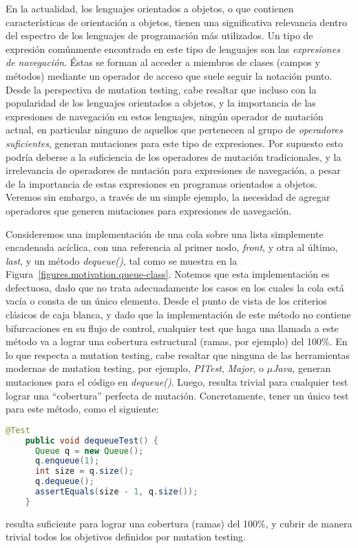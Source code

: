 En la actualidad, los lenguajes orientados a objetos, o que contienen caracter\'isticas de orientaci\'on a objetos, tienen una significativa relevancia dentro del espectro de los lenguajes de programaci\'on m\'as utilizados. Un tipo de expresi\'on com\'unmente encontrado en este tipo de lenguajes son las \emph{expresiones de navegaci\'on}. \'Estas se forman al acceder a miembros de clases (campos y m\'etodos) mediante un operador de acceso que suele seguir la notaci\'on punto. Desde la perspectiva de mutation testing, cabe resaltar que incluso con la popularidad de los lenguajes orientados a objetos, y la importancia de las expresiones de navegaci\'on en estos lenguajes, ning\'un operador de mutaci\'on actual, en particular ninguno de aquellos que pertenecen al grupo de \emph{operadores suficientes}, generan mutaciones para este tipo de expresiones. Por supuesto esto podr\'ia deberse a la suficiencia de los operadores de mutaci\'on tradicionales, y la irrelevancia de operadores de mutaci\'on para expresiones de navegaci\'on, a pesar de la importancia de estas expresiones en programas orientados a objetos. Veremos sin embargo, a trav\'es de un simple ejemplo, la necesidad de agregar operadores que generen mutaciones para expresiones de navegaci\'on.

Consideremos una implementaci\'on de una cola sobre una lista simplemente encadenada ac\'iclica, con una referencia al primer nodo, \emph{front}, y otra al \'ultimo, \emph{last}, y un m\'etodo \emph{dequeue()}, tal como se muestra en la Figura~\ref{figures.motivation.queue-class}. Notemos que esta implementaci\'on es defectuosa, dado que no trata adecuadamente los casos en los cuales la cola est\'a vac\'ia o consta de un \'unico elemento. Desde el punto de vista de los criterios cl\'asicos de caja blanca, y dado que la implementaci\'on de este m\'etodo no contiene bifurcaciones en su flujo de control, cualquier test que haga una llamada a este m\'etodo va a lograr una cobertura estructural (ramas, por ejemplo) del 100\%. En lo que respecta a mutation testing, cabe resaltar que ninguna de las herramientas modernas de mutation testing, por ejemplo, \emph{PITest}, \emph{Major}, o \emph{$\mu$Java}, generan mutaciones para el c\'odigo en \emph{dequeue()}. Luego, resulta trivial para cualquier test lograr una ``cobertura'' perfecta de mutaci\'on. Concretamente, tener un \'unico test para este m\'etodo, como el siguiente:

\begin{center}
	\begin{lstlisting}[frame=tlrb, mathescape=true, language=Java]
    @Test
    public void dequeueTest() {
      Queue q = new Queue();
      q.enqueue(1);
      int size = q.size();
      q.dequeue();
      assertEquals(size - 1, q.size());
    }
	\end{lstlisting}
\end{center}
resulta suficiente para lograr una cobertura (ramas) del 100\%, y cubrir de manera trivial todos los objetivos definidos por mutation testing.

